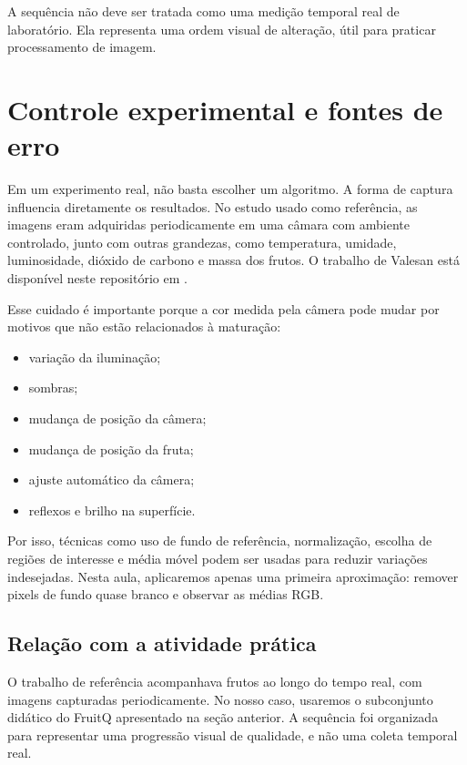 \documentclass[12pt]{article}
\begin{document}
A sequência não deve ser tratada como uma medição temporal real de laboratório. Ela representa uma ordem visual de alteração, útil para praticar processamento de imagem.

\section{Controle experimental e fontes de erro}

Em um experimento real, não basta escolher um algoritmo. A forma de captura influencia diretamente os resultados. No estudo usado como referência, as imagens eram adquiridas periodicamente em uma câmara com ambiente controlado, junto com outras grandezas, como temperatura, umidade, luminosidade, dióxido de carbono e massa dos frutos. O trabalho de Valesan está disponível neste repositório em .

Esse cuidado é importante porque a cor medida pela câmera pode mudar por motivos que não estão relacionados à maturação:

\begin{itemize}
  \item variação da iluminação;
  \item sombras;
  \item mudança de posição da câmera;
  \item mudança de posição da fruta;
  \item ajuste automático da câmera;
  \item reflexos e brilho na superfície.
\end{itemize}

Por isso, técnicas como uso de fundo de referência, normalização, escolha de regiões de interesse e média móvel podem ser usadas para reduzir variações indesejadas. Nesta aula, aplicaremos apenas uma primeira aproximação: remover pixels de fundo quase branco e observar as médias RGB.

\subsection{Relação com a atividade prática}

O trabalho de referência acompanhava frutos ao longo do tempo real, com imagens capturadas periodicamente. No nosso caso, usaremos o subconjunto didático do FruitQ apresentado na seção anterior. A sequência foi organizada para representar uma progressão visual de qualidade, e não uma coleta temporal real.
\end{document}
